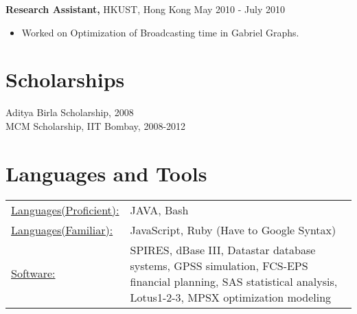 \documentclass[margin]{res}
\begin{document}
\begin{resume}
 {\bf Research Assistant,} HKUST, Hong Kong \hfill May  2010  - July  2010
 \begin{itemize} \itemsep -2pt  %
 \item Worked  on  Optimization  of  Broadcasting  time  in  Gabriel  Graphs.
 \end{itemize}





\section{Scholarships}
Aditya Birla Scholarship, 2008 \\
MCM Scholarship, IIT Bombay, 2008-2012 \\


\section{Languages and Tools}
   \begin{tabular}{l p{3in}}
    \underline{Languages(Proficient):} & JAVA, Bash \\
    \underline{Languages(Familiar):} &  JavaScript, Ruby (Have to Google Syntax) \\

     \underline{Software:} &  SPIRES, dBase III, Datastar database
                        systems, GPSS simulation, FCS-EPS financial
                        planning, SAS statistical analysis,
                        Lotus1-2-3, MPSX optimization modeling
 \end{tabular}

\end{resume}
\end{document}

